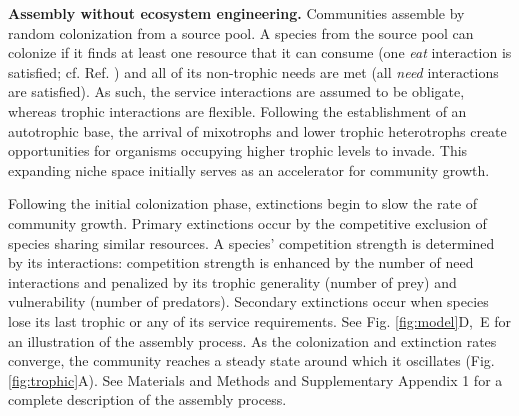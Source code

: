 \documentclass[twocolumn,preprintnumbers,amsmath,amssymb,superscriptaddress,linenumbers]{revtex4-1}
\begin{document}
\vspace{0mm}
\noindent \textbf{Assembly without ecosystem engineering.}
\noindent Communities assemble by random colonization from a source pool.
A species from the source pool can colonize if it finds at least one resource that it can consume (one \emph{eat} interaction is satisfied; cf. Ref. ) and all of its non-trophic needs are met (all \emph{need} interactions are satisfied). 
As such, the service interactions are assumed to be obligate, whereas trophic interactions are flexible.
Following the establishment of an autotrophic base, the arrival of mixotrophs and lower trophic heterotrophs create opportunities for organisms occupying higher trophic levels to invade.
This expanding niche space initially serves as an accelerator for community growth.

Following the initial colonization phase, extinctions begin to slow the rate of community growth.
Primary extinctions occur by the competitive exclusion of species sharing similar resources.
A species' competition strength is determined by its interactions: competition strength is enhanced by the number of need interactions and penalized by its trophic generality (number of prey) and vulnerability (number of predators).
Secondary extinctions occur when species lose its last trophic or any of its service requirements.
See Fig. \ref{fig:model}D,~E for an illustration of the assembly process. 
As the colonization and extinction rates converge, the community reaches a steady state around which it oscillates (Fig. \ref{fig:trophic}A).
See Materials and Methods and Supplementary Appendix 1 for a complete description of the assembly process. %
\end{document}
